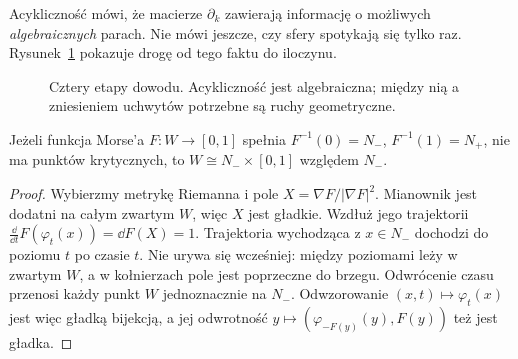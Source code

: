 Acykliczność mówi, że macierze
$\partial_k$ zawierają informację
o możliwych \emph{algebraicznych}
parach. Nie mówi jeszcze, czy
sfery spotykają się tylko raz.
Rysunek~\ref{fig:plan-smale-19}
pokazuje drogę od tego faktu
do iloczynu.

\begin{figure}[htbp]
\centering
{}
\caption{Cztery etapy dowodu. Acykliczność
jest algebraiczna; między nią a zniesieniem
uchwytów potrzebne są ruchy geometryczne.}
\label{fig:plan-smale-19}
\end{figure}

\begin{lemat}
\label{lem:brak-krytycznych-hc-19}
Jeżeli funkcja Morse'a $F:W\to[0,1]$ spełnia
$F^{-1}(0)=N_-$, $F^{-1}(1)=N_+$,
nie ma punktów krytycznych, to
$W\cong N_-\times[0,1]$
względem $N_-$.
\end{lemat}
\begin{proof}
Wybierzmy metrykę Riemanna i pole
$X=\nabla F/|\nabla F|^2$.
Mianownik jest dodatni na całym
zwartym $W$, więc $X$ jest gładkie.
Wzdłuż jego trajektorii
$\frac{\dd}{\dd t}F(\varphi_t(x))
 =\dd F(X)=1$.
Trajektoria wychodząca z $x\in N_-$
dochodzi do poziomu $t$ po czasie $t$.
Nie urywa się wcześniej: między
poziomami leży w zwartym $W$,
a w kołnierzach pole jest poprzeczne
do brzegu. Odwrócenie czasu
przenosi każdy punkt $W$
jednoznacznie na $N_-$.
Odwzorowanie $(x,t)\mapsto\varphi_t(x)$
jest więc gładką bijekcją,
a jej odwrotność
$y\mapsto(\varphi_{-F(y)}(y),F(y))$
też jest gładka.
\end{proof}

